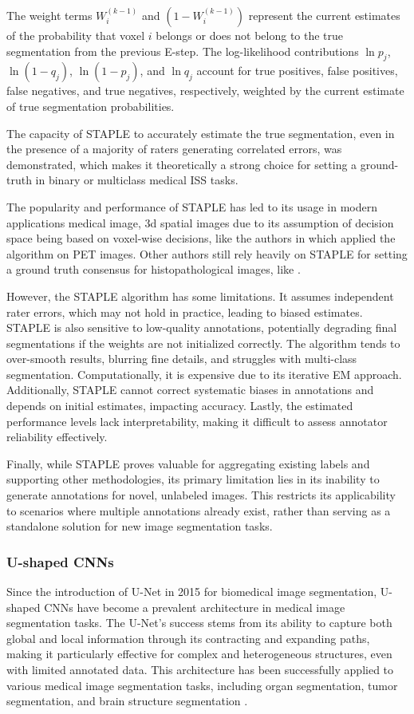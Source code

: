 The weight terms $W_i^{(k-1)}$ and $(1 - W_i^{(k-1)})$
represent the current estimates of the probability that voxel $i$
belongs or does not belong to the true segmentation from the previous
E-step. The log-likelihood contributions $\ln p_j$, $\ln (1 - q_j)$,
$\ln (1 - p_j)$, and $\ln q_j$ account for true positives, false
positives, false negatives, and true negatives, respectively,
weighted by the current estimate of true segmentation probabilities.

The capacity of STAPLE to accurately estimate the true segmentation,
even in the presence of a majority of raters generating correlated
errors, was demonstrated, which makes it theoretically a strong
choice for setting a ground-truth in binary or multiclass medical
\gls{ISS} tasks.

The popularity and performance of \gls{STAPLE} has led to its
usage in modern applications medical image, 3d spatial images due to
its assumption of decision space being based on voxel-wise decisions,
like the authors in \cite{GrefveEtAl2024} which applied the algorithm
on \gls{PET} images. Other authors still rely heavily on STAPLE for
setting a ground truth consensus for histopathological images, like
\cite{QiuEtAl2022}.

However, the \gls{STAPLE} algorithm has some limitations. It
assumes independent rater errors, which may not hold in practice,
leading to biased estimates. STAPLE is also sensitive to low-quality
annotations, potentially degrading final segmentations if the weights
are not initialized correctly. The algorithm tends to over-smooth
results, blurring fine details, and struggles with multi-class
segmentation. Computationally, it is expensive due to its iterative
\gls{EM} approach. Additionally, STAPLE cannot correct systematic biases in
annotations and depends on initial estimates, impacting accuracy.
Lastly, the estimated performance levels lack interpretability,
making it difficult to assess annotator reliability effectively.

Finally, while \gls{STAPLE} proves valuable for aggregating existing
labels and supporting other methodologies, its primary limitation
lies in its inability to generate annotations for novel, unlabeled
images. This restricts its applicability to scenarios where multiple
annotations already exist, rather than serving as a standalone
solution for new image segmentation tasks.

\subsubsection{U-shaped \gls{CNN}s}
Since the introduction of U-Net \cite{RonnebergerEtAl2015} in 2015
for biomedical image segmentation, U-shaped \gls{CNN}s have become a
prevalent architecture in medical image segmentation tasks. The
U-Net's success stems from its ability to capture both global and
local information through its contracting and expanding paths, making
it particularly effective for complex and heterogeneous structures,
even with limited annotated data. This architecture has been
successfully applied to various medical image segmentation tasks,
including organ segmentation, tumor segmentation, and brain structure
segmentation \cite{Azad2024}.

